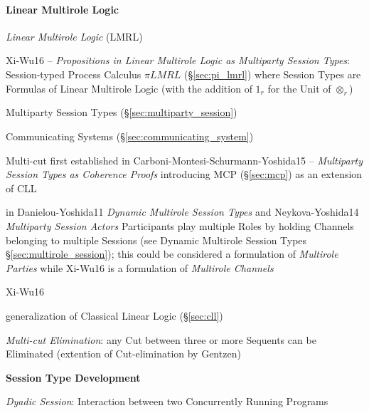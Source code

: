 \paragraph{Linear Multirole Logic}\label{sec:lmrl}\hfill

\begingroup

\newcommand{\msg}{\mathtt{msg}}
\newcommand{\nil}{\mathtt{nil}}

\newcommand{\channelsend}{\mathtt{channel\_send}}
\newcommand{\channelrecv}{\mathtt{channel\_recv}}
\newcommand{\channelclose}{\mathtt{channel\_close}}
\newcommand{\channelskip}{\mathtt{channel\_skip}}

\newcommand{\Chan}{\mathsf{Chan}}
\newcommand{\Int}{\mathsf{Int}}
\renewcommand{\Unit}{\mathsf{()}}

\emph{Linear Multirole Logic} (LMRL)

Xi-Wu16 -- \emph{Propositions in Linear Multirole Logic as Multiparty
  Session Types}: Session-typed Process Calculus $\pi LMRL$
(\S\ref{sec:pi_lmrl}) where Session Types are Formulas of Linear
Multirole Logic (with the addition of $1_r$ for the Unit of
$\otimes_r$)

\fist Multiparty Session Types (\S\ref{sec:multiparty_session})

\fist Communicating Systems (\S\ref{sec:communicating_system})

Multi-cut first established in Carboni-Montesi-Schurmann-Yoshida15 --
\emph{Multiparty Session Types as Coherence Proofs} introducing MCP
(\S\ref{sec:mcp}) as an extension of CLL

\fist in Danielou-Yoshida11 \emph{Dynamic Multirole Session Types} and
Neykova-Yoshida14 \emph{Multiparty Session Actors} Participants play
multiple Roles by holding Channels belonging to multiple Sessions (see
Dynamic Multirole Session Types \S\ref{sec:multirole_session}); this
could be considered a formulation of \emph{Multirole Parties} while
Xi-Wu16 is a formulation of \emph{Multirole Channels}


\asterism

Xi-Wu16

generalization of Classical Linear Logic (\S\ref{sec:cll})

\emph{Multi-cut Elimination}: any Cut between three or more Sequents
can be Eliminated (extention of Cut-elimination by Gentzen)


\textbf{Session Type Development}

\emph{Dyadic Session}: Interaction between two Concurrently Running Programs

